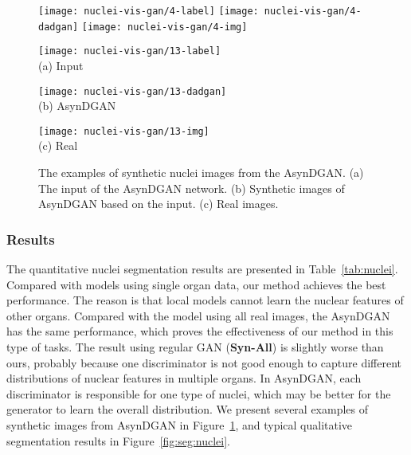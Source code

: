 \begin{figure}[t]
	\begin{center}
		\texttt{[image: nuclei-vis-gan/4-label]}
		\texttt{[image: nuclei-vis-gan/4-dadgan]}
		\texttt{[image: nuclei-vis-gan/4-img]}\\ \vspace{0.01in}
		\begin{minipage}{0.3\linewidth}
			\centering\texttt{[image: nuclei-vis-gan/13-label]} \\ (a) Input
		\end{minipage}
		\begin{minipage}{0.3\linewidth}
			\centering\texttt{[image: nuclei-vis-gan/13-dadgan]} \\ (b) AsynDGAN
		\end{minipage}
		\begin{minipage}{0.3\linewidth}
			\centering\texttt{[image: nuclei-vis-gan/13-img]}  \\  (c) Real
		\end{minipage}
	\end{center}
	\vspace{-0.5em}
	\caption{The examples of synthetic nuclei images from the AsynDGAN. (a) The input of the AsynDGAN network. (b) Synthetic images of AsynDGAN based on the input. (c) Real images.}
	\label{fig:syn:nuclei}
	\vspace{-0.5em}
\end{figure}
\vspace{-0.5em}
\subsubsection{Results}
The quantitative nuclei segmentation results are presented in Table~\ref{tab:nuclei}. Compared with models using single organ data, our method achieves the best performance. The reason is that local models cannot learn the nuclear features of other organs. Compared with the model using all real images, the AsynDGAN has the same performance, which proves the effectiveness of our method in this type of tasks. The result using regular GAN (\textbf{Syn-All}) is slightly worse than ours, probably because one discriminator is not good enough to capture different distributions of nuclear features in multiple organs. In AsynDGAN, each discriminator is responsible for one type of nuclei, which may be better for the generator to learn the overall distribution. We present several examples of synthetic images from AsynDGAN in Figure~\ref{fig:syn:nuclei}, and typical qualitative segmentation results in Figure~\ref{fig:seg:nuclei}.





